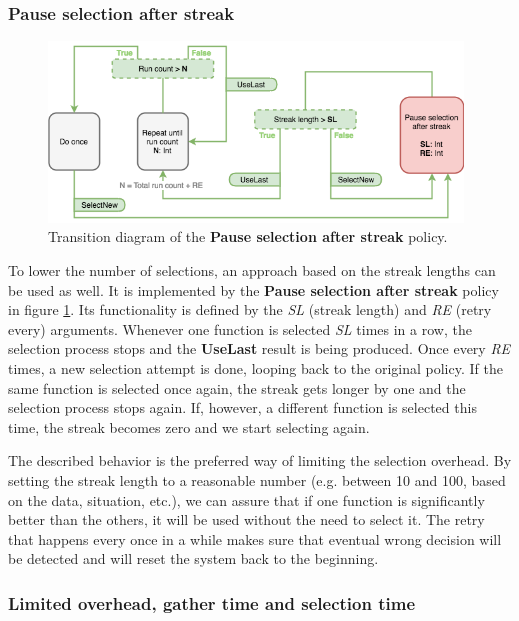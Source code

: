 \subsubsection{Pause selection after streak}

\begin{figure}[h!]
	\captionsetup{justification=centering,margin=0.5cm}
	\centerline{\mbox{\includegraphics[width=110mm]{./img/pause_selection_after_streak.png}}}
	\caption{Transition diagram of the \textbf{Pause selection after streak} policy.}
	\label{fig:pause_selection_after_streak}
\end{figure}

To lower the number of selections, an approach based on the streak lengths can be used as well. It is implemented by the \textbf{Pause selection after streak} policy in figure \ref{fig:pause_selection_after_streak}. Its functionality is defined by the \textit{SL} (streak length) and \textit{RE} (retry every) arguments. Whenever one function is selected \textit{SL} times in a row, the selection process stops and the \textbf{UseLast} result is being produced. Once every \textit{RE} times, a new selection attempt is done, looping back to the original policy. If the same function is selected once again, the streak gets longer by one and the selection process stops again. If, however, a different function is selected this time, the streak becomes zero and we start selecting again.

The described behavior is the preferred way of limiting the selection overhead. By setting the streak length to a reasonable number (e.g. between 10 and 100, based on the data, situation, etc.), we can assure that if one function is significantly better than the others, it will be used without the need to select it. The retry that happens every once in a while makes sure that eventual wrong decision will be detected and will reset the system back to the beginning.

\subsubsection{Limited overhead, gather time and selection time}

